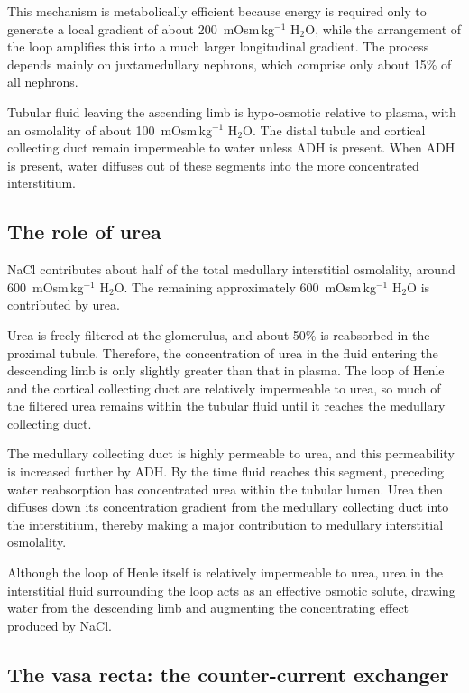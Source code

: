 \documentclass[11pt,a4paper]{article}
\begin{document}
This mechanism is metabolically efficient because energy is required only to generate a local gradient of about 200~mOsm\,kg$^{-1}$ H$_2$O, while the arrangement of the loop amplifies this into a much larger longitudinal gradient. The process depends mainly on juxtamedullary nephrons, which comprise only about 15\% of all nephrons.

Tubular fluid leaving the ascending limb is hypo-osmotic relative to plasma, with an osmolality of about 100~mOsm\,kg$^{-1}$ H$_2$O. The distal tubule and cortical collecting duct remain impermeable to water unless ADH is present. When ADH is present, water diffuses out of these segments into the more concentrated interstitium.

\subsection{The role of urea}

NaCl contributes about half of the total medullary interstitial osmolality, around 600~mOsm\,kg$^{-1}$ H$_2$O. The remaining approximately 600~mOsm\,kg$^{-1}$ H$_2$O is contributed by urea.

Urea is freely filtered at the glomerulus, and about 50\% is reabsorbed in the proximal tubule. Therefore, the concentration of urea in the fluid entering the descending limb is only slightly greater than that in plasma. The loop of Henle and the cortical collecting duct are relatively impermeable to urea, so much of the filtered urea remains within the tubular fluid until it reaches the medullary collecting duct.

The medullary collecting duct is highly permeable to urea, and this permeability is increased further by ADH. By the time fluid reaches this segment, preceding water reabsorption has concentrated urea within the tubular lumen. Urea then diffuses down its concentration gradient from the medullary collecting duct into the interstitium, thereby making a major contribution to medullary interstitial osmolality.

Although the loop of Henle itself is relatively impermeable to urea, urea in the interstitial fluid surrounding the loop acts as an effective osmotic solute, drawing water from the descending limb and augmenting the concentrating effect produced by NaCl.

\subsection{The vasa recta: the counter-current exchanger}
\end{document}
